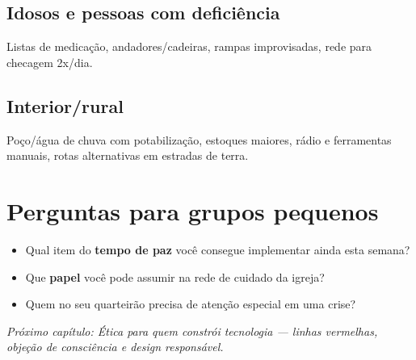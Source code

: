 \subsection*{Idosos e pessoas com deficiência}
Listas de medicação, andadores/cadeiras, rampas improvisadas, rede para checagem 2x/dia.
\subsection*{Interior/rural}
Poço/água de chuva com potabilização, estoques maiores, rádio e ferramentas manuais, rotas alternativas em estradas de terra.

\section{Perguntas para grupos pequenos}
\begin{itemize}[leftmargin=*,noitemsep]
  \item Qual item do \textbf{tempo de paz} você consegue implementar ainda esta semana?
  \item Que \textbf{papel} você pode assumir na rede de cuidado da igreja?
  \item Quem no seu quarteirão precisa de atenção especial em uma crise?
\end{itemize}

\bigskip
\noindent\textit{Próximo capítulo: Ética para quem constrói tecnologia — linhas vermelhas, objeção de consciência e design responsável.}
